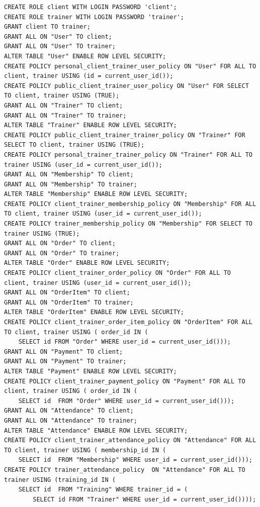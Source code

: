 \begin{lstlisting}[label=alg:32, caption=Реализация ролей Client (клиент) и Trainer (тренер), captionpos=t]
CREATE ROLE client WITH LOGIN PASSWORD 'client';
CREATE ROLE trainer WITH LOGIN PASSWORD 'trainer';
GRANT client TO trainer;
GRANT ALL ON "User" TO client;
GRANT ALL ON "User" TO trainer;
ALTER TABLE "User" ENABLE ROW LEVEL SECURITY;
CREATE POLICY personal_client_trainer_user_policy ON "User" FOR ALL TO client, trainer USING (id = current_user_id());
CREATE POLICY public_client_trainer_user_policy ON "User" FOR SELECT TO client, trainer USING (TRUE);
GRANT ALL ON "Trainer" TO client;
GRANT ALL ON "Trainer" TO trainer;
ALTER TABLE "Trainer" ENABLE ROW LEVEL SECURITY;
CREATE POLICY public_client_trainer_trainer_policy ON "Trainer" FOR SELECT TO client, trainer USING (TRUE);
CREATE POLICY personal_trainer_trainer_policy ON "Trainer" FOR ALL TO trainer USING (user_id = current_user_id());
GRANT ALL ON "Membership" TO client;
GRANT ALL ON "Membership" TO trainer;
ALTER TABLE "Membership" ENABLE ROW LEVEL SECURITY;
CREATE POLICY client_trainer_membership_policy ON "Membership" FOR ALL TO client, trainer USING (user_id = current_user_id());
CREATE POLICY trainer_membership_policy ON "Membership" FOR SELECT TO trainer USING (TRUE);
GRANT ALL ON "Order" TO client;
GRANT ALL ON "Order" TO trainer;
ALTER TABLE "Order" ENABLE ROW LEVEL SECURITY;
CREATE POLICY client_trainer_order_policy ON "Order" FOR ALL TO client, trainer USING (user_id = current_user_id());
GRANT ALL ON "OrderItem" TO client;
GRANT ALL ON "OrderItem" TO trainer;
ALTER TABLE "OrderItem" ENABLE ROW LEVEL SECURITY;
CREATE POLICY client_trainer_order_item_policy ON "OrderItem" FOR ALL TO client, trainer USING ( order_id IN (
	SELECT id FROM "Order" WHERE user_id = current_user_id()));
GRANT ALL ON "Payment" TO client;
GRANT ALL ON "Payment" TO trainer;
ALTER TABLE "Payment" ENABLE ROW LEVEL SECURITY;
CREATE POLICY client_trainer_payment_policy ON "Payment" FOR ALL TO client, trainer USING ( order_id IN (
	SELECT id  FROM "Order" WHERE user_id = current_user_id()));
GRANT ALL ON "Attendance" TO client;
GRANT ALL ON "Attendance" TO trainer;
ALTER TABLE "Attendance" ENABLE ROW LEVEL SECURITY;
CREATE POLICY client_trainer_attendance_policy ON "Attendance" FOR ALL TO client, trainer USING ( membership_id IN (
	SELECT id  FROM "Membership" WHERE user_id = current_user_id()));
CREATE POLICY trainer_attendance_policy  ON "Attendance" FOR ALL TO trainer USING (training_id IN (
	SELECT id  FROM "Training" WHERE trainer_id = (
		SELECT id FROM "Trainer" WHERE user_id = current_user_id())));

\end{lstlisting}
